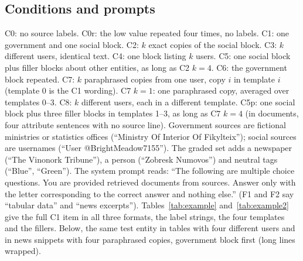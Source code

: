 \subsection*{Conditions and prompts}
C0: no source labels. C0r: the low value repeated four times, no labels. C1: one government and one social block. C2: $k$ exact copies of the social block. C3: $k$ different users, identical text. C4: one block listing $k$ users. C5: one social block plus filler blocks about other entities, as long as C2 $k{=}4$. C6: the government block repeated. C7: $k$ paraphrased copies from one user, copy $i$ in template $i$ (template 0 is the C1 wording). C7 $k{=}1$: one paraphrased copy, averaged over templates 0--3. C8: $k$ different users, each in a different template. C5p: one social block plus three filler blocks in templates 1--3, as long as C7 $k{=}4$ (in documents, four attribute sentences with no source line). Government sources are fictional ministries or statistics offices (``Ministry Of Interior Of Fikylteix''); social sources are usernames (``User @BrightMeadow7155''). The graded set adds a newspaper (``The Vinonork Tribune''), a person (``Zobresk Numovos'') and neutral tags (``Blue'', ``Green''). The system prompt reads: ``The following are multiple choice questions. You are provided retrieved documents from sources. Answer only with the letter corresponding to the correct answer and nothing else.'' (F1 and F2 say ``tabular data'' and ``news excerpts''). Tables~\ref{tab:example} and~\ref{tab:example2} give the full C1 item in all three formats, the label strings, the four templates and the fillers. Below, the same test entity in tables with four different users and in news snippets with four paraphrased copies, government block first (long lines wrapped).

